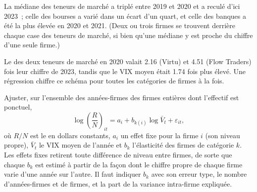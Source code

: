 \noindent La médiane des teneurs de marché a triplé entre 2019 et 2020 et a reculé
d'ici 2023~; celle des bourses a varié dans un écart d'un quart, et celle des banques a été la plus élevée en 2020 et 2021.
(Deux ou trois firmes se trouvent derrière chaque case des teneurs de marché, si bien qu'une médiane y est proche du chiffre d'une seule firme.)

Le  des deux teneurs de marché en 2020 valait 2.16 (Virtu) et 4.51 (Flow Traders) fois leur chiffre de 2023,
tandis que le VIX moyen était 1.74 fois plus élevé. Une régression chiffre ce schéma pour toutes les catégories de firmes à la fois.

\begin{method}\label{met:in:revenue-and-profit-across-the-industry:fe}
Ajuster, sur l'ensemble des années-firmes des firmes entières dont l'effectif est ponctuel,
\[
\log\left(\frac{R}{N}\right)_{it}=a_i+b_{k(i)}\log \bar V_t+\varepsilon_{it},
\]
où $R/N$ est le  en dollars constants, $a_i$ un effet fixe pour la firme $i$ (son niveau propre), $\bar V_t$ le
VIX moyen de l'année et $b_k$ l'élasticité des firmes de catégorie $k$. Les effets fixes retirent toute différence de niveau
entre firmes, de sorte que chaque $b_k$ est estimé à partir de la façon dont le chiffre propre de chaque firme varie d'une année sur l'autre. Il faut indiquer $b_k$ avec son
erreur type, le nombre d'années-firmes et de firmes, et la part de la variance intra-firme expliquée.
\end{method}

